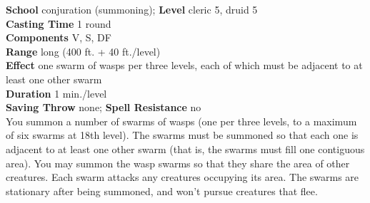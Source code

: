 \textbf{School} conjuration (summoning); \textbf{Level} cleric 5, druid 5\\
\textbf{Casting Time} 1 round\\
\textbf{Components} V, S, DF\\
\textbf{Range} long (400 ft. + 40 ft./level)\\
\textbf{Effect} one swarm of wasps per three levels, each of which must be adjacent to at least one other swarm\\
\textbf{Duration} 1 min./level \\
\textbf{Saving Throw} none; \textbf{Spell Resistance} no\\
You summon a number of swarms of wasps (one per three levels, to a maximum of six swarms at 18th level). The swarms must be summoned so that each one is adjacent to at least one other swarm (that is, the swarms must fill one contiguous area). You may summon the wasp swarms so that they share the area of other creatures. Each swarm attacks any creatures occupying its area. The swarms are stationary after being summoned, and won't pursue creatures that flee.\\
